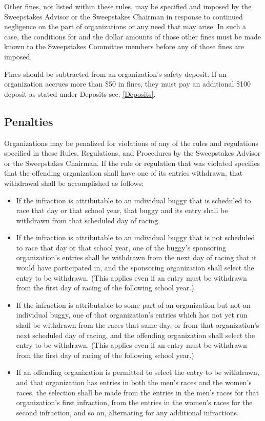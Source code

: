 	Other fines, not listed within these rules, may be specified and imposed by the
	Sweepstakes Advisor or the Sweepstakes Chairman in response to continued
	negligence on the part of organizations or any need that may arise. In such a
	case, the conditions for and the dollar amounts of those other fines must be
	made known to the Sweepstakes Committee members before any of those fines are
	imposed.

	Fines should be subtracted from an organization's safety deposit. If an
	organization accrues more than \$50 in fines, they must pay an additional \$100
	deposit as stated under Deposits sec. \ref{Deposits}.

\subsection{Penalties}

	Organizations may be penalized for violations of any of the rules and
	regulations specified in these Rules, Regulations, and Procedures by the
	Sweepstakes Advisor or the Sweepstakes Chairman. If the rule or regulation that
	was violated specifies that the offending organization shall have one of its
	entries withdrawn, that withdrawal shall be accomplished as follows:

	\begin{itemize}

		\item
		If the infraction is attributable to an individual buggy that is scheduled to
		race that day or that school year, that buggy and its entry shall be withdrawn
		from that scheduled day of racing.

		\item
		If the infraction is attributable to an individual buggy that is not scheduled
		to race that day or that school year, one of the buggy's sponsoring
		organization's entries shall be withdrawn from the next day of racing that it
		would have participated in, and the sponsoring organization shall select the
		entry to be withdrawn. (This applies even if an entry must be withdrawn from
		the first day of racing of the following school year.)

		\item
		If the infraction is attributable to some part of an organization but not an
		individual buggy, one of that organization's entries which has not yet run
		shall be withdrawn from the races that same day, or from that organization's
		next scheduled day of racing, and the offending organization shall select the
		entry to be withdrawn. (This applies even if an entry must be withdrawn from
		the first day of racing of the following school year.)

		\item
		If an offending organization is permitted to select the entry to be withdrawn,
		and that organization has entries in both the men's races and the women's
		races, the selection shall be made from the entries in the men's races for that
		organization's first infraction, from the entries in the women's races for the
		second infraction, and so on, alternating for any additional infractions.

	\end{itemize}

